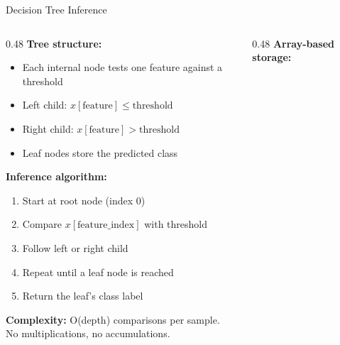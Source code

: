 \documentclass[aspectratio=169, 10pt]{beamer}
\begin{document}
\begin{frame}{Decision Tree Inference}
\begin{columns}[T]
\begin{column}{0.48\textwidth}
\textbf{Tree structure:}
\begin{itemize}
  \item Each internal node tests one feature against a threshold
  \item Left child: $x[\text{feature}] \leq \text{threshold}$
  \item Right child: $x[\text{feature}] > \text{threshold}$
  \item Leaf nodes store the predicted class
\end{itemize}

\vspace{0.5em}
\textbf{Inference algorithm:}
\begin{enumerate}
  \item Start at root node (index 0)
  \item Compare $x[\text{feature\_index}]$ with threshold
  \item Follow left or right child
  \item Repeat until a leaf node is reached
  \item Return the leaf's class label
\end{enumerate}

\vspace{0.5em}
\textbf{Complexity:} O(depth) comparisons per sample.\\
No multiplications, no accumulations.
\end{column}

\begin{column}{0.48\textwidth}
\textbf{Array-based storage:}
\begin{center}
\end{center}
\end{column}
\end{columns}
\end{frame}
\end{document}
